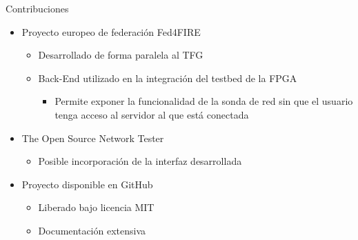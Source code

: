 \begin{frame}{Contribuciones}
  \begin{itemize}
    \item Proyecto europeo de federación Fed4FIRE
    \begin{itemize}
      \item Desarrollado de forma paralela al TFG
      \item Back-End utilizado en la integración del testbed de la FPGA
      \begin{itemize}
        \item Permite exponer la funcionalidad de la sonda de red sin que el usuario tenga acceso al servidor al que está conectada
      \end{itemize}
    \end{itemize}
    \item The Open Source Network Tester
    \begin{itemize}
      \item Posible incorporación de la interfaz desarrollada
    \end{itemize}
    \item Proyecto disponible en GitHub
    \begin{itemize}
      \item Liberado bajo licencia MIT
      \item Documentación extensiva
    \end{itemize}
  \end{itemize}
\end{frame}
